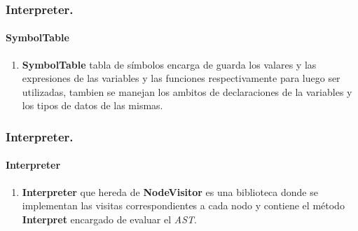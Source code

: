 \documentclass[12pt]{beamer}
\begin{document}
	\begin{frame}[fragile]
		\frametitle{Interpreter.}
		\framesubtitle{SymbolTable}
		
		\begin{enumerate}
			\item \textbf{SymbolTable} tabla de símbolos encarga de guarda los valares y las expresiones de las variables y las funciones respectivamente para luego ser utilizadas, tambien se manejan los ambitos de declaraciones de la variables y los tipos de datos de las mismas.
		\end{enumerate}
	\end{frame}
	
	\begin{frame}[fragile]
		\frametitle{Interpreter.}
		\framesubtitle{Interpreter}
		
		\begin{enumerate}
			\item \textbf{Interpreter} que hereda de \textbf{NodeVisitor} es una biblioteca donde se implementan las visitas correspondientes a cada nodo y contiene el método \textbf{Interpret} encargado de evaluar el \emph{AST}.
		\end{enumerate}
	\end{frame}
	
\end{document}
